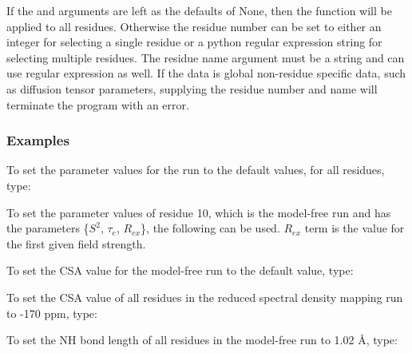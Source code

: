  If the  and  arguments are left as the defaults of None, then the function will be applied to all residues.  Otherwise the residue number can be set to either an integer for selecting a single residue or a python regular expression string for selecting multiple residues.  The residue name argument must be a string and can use regular expression as well.  If the data is global non-residue specific data, such as diffusion tensor parameters, supplying the residue number and name will terminate the program with an error. 
  

  
 \subsubsection{Examples} 

 To set the parameter values for the run  to the default values, for all residues, type: 
  


 To set the parameter values of residue 10, which is the model-free run  and has the parameters \{$S^2$, $\tau_e$, $R_{ex}$\}, the following can be used.  $R_{ex}$ term is the value for the first given field strength. 
  



 To set the CSA value for the model-free run  to the default value, type: 
  


 To set the CSA value of all residues in the reduced spectral density mapping run  to -170 ppm, type: 
  



 To set the NH bond length of all residues in the model-free run  to 1.02 \AA, type: 
  



